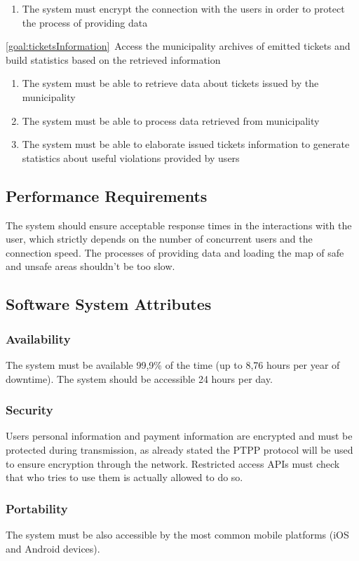 \begin{description}
\begin{enumerate}[resume*]
   				\item The system must encrypt the connection with the users in order to protect the process of providing data
  			\end{enumerate}
  		\item \ref{goal:ticketsInformation}\ Access the municipality archives of emitted tickets and build statistics based on the retrieved information
  			\begin{enumerate}[resume*] 
  				\item The system must be able to retrieve data about tickets issued by the municipality 
   				\item The system must be able to process data retrieved from municipality
   				\item The system must be able to elaborate issued tickets information to generate statistics about useful violations provided by users
   			\end{enumerate}
   	\end{description}
  	
\subsection{Performance Requirements}
	The system should ensure acceptable response times in the interactions with the user, which strictly depends on the number of concurrent users and the connection speed.
\newline
The processes of providing data and loading the map of safe and unsafe areas shouldn't be too slow.
\subsection{Software System Attributes}
	\subsubsection{Availability}
	The system must be available 99,9\% of the time (up to 8,76 hours per year of downtime). The system should be accessible 24 hours per day.
	\subsubsection{Security}
	Users personal information and payment information are encrypted and must be protected during transmission, as already stated the PTPP protocol will be used to ensure encryption through the network.
	Restricted access APIs must check that who tries to use them is actually allowed to do so.
	\subsubsection{Portability}
	The system must be also accessible by the most common mobile platforms (iOS and Android devices).

